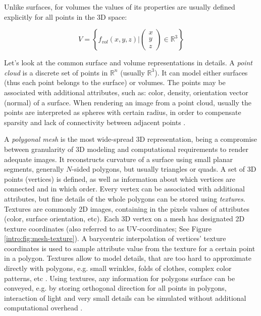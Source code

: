 Unlike surfaces, for volumes the values of its properties are usually defined explicitly for all points in the 3D space:

\begin{equation}
	\renewcommand\arraystretch{0.6}
	V = \left\{ f_{vol}(x,y,z)  \Bigg\rvert \begin{pmatrix} x \\ y \\ z \end{pmatrix} \in \mathbb{R}^3 \right\}
\end{equation}
  

Let's look at the common surface and volume representations in details. A \textit{point cloud} is a discrete set of points in $\mathbb{R}^n$ (usually $\mathbb{R}^3$). It can model either surfaces (thus each point belongs to the surface) or volumes. The points may be associated with additional attributes, such as: color, density, orientation vector (normal) of a surface. When rendering an image from a point cloud, usually the points are interpreted as spheres with certain radius, in order to compensate sparsity and lack of connectivity between adjacent points \cite{aux:pointcloud21}.

A \textit{polygonal mesh} is the most wide-spread 3D representation, being a compromise between granularity of 3D modeling and computational requirements to render adequate images. It reconstructs curvature of a surface using small planar segments, generally $N$-sided polygons, but usually triangles or quads. A set of 3D points (vertices) is defined, as well as information about which vertices are connected and in which order. Every vertex can be associated with additional attributes, but fine details of the whole polygons can be stored using \textit{textures}. Textures are commonly 2D images, containing in the pixels values of attributes (color, surface orientation, etc). Each 3D vertex on a mesh has designated 2D texture coordinates (also referred to as UV-coordinates; See Figure \ref{intro:fig:mesh-texture}). A barycentric interpolation of vertices' texture coordinates is used to sample attribute value from the texture for a certain point in a polygon. Textures allow to model details, that are too hard to approximate directly with polygons, e.g. small wrinkles, folds of clothes, complex color patterns, etc . Using textures, any information for polygons surface can be conveyed, e.g. by storing orthogonal direction for all points in polygons, interaction of light and very small details can be simulated without additional computational overhead \cite{aux:normal-mapping78}. 

